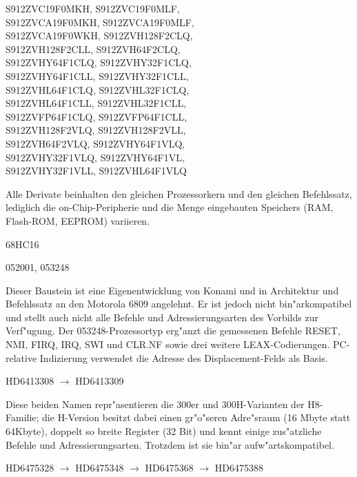 \documentclass[12pt,a4paper,twoside]{report}
\begin{document}
\begin{cpulist}
   S912ZVC19F0MKH, S912ZVC19F0MLF,\\
\> S912ZVCA19F0MKH, S912ZVCA19F0MLF,\\
\> S912ZVCA19F0WKH, S912ZVH128F2CLQ,\\
\> S912ZVH128F2CLL, S912ZVH64F2CLQ,\\
\> S912ZVHY64F1CLQ, S912ZVHY32F1CLQ,\\
\> S912ZVHY64F1CLL, S912ZVHY32F1CLL,\\
\> S912ZVHL64F1CLQ, S912ZVHL32F1CLQ,\\
\> S912ZVHL64F1CLL, S912ZVHL32F1CLL,\\
\> S912ZVFP64F1CLQ, S912ZVFP64F1CLL,\\
\> S912ZVH128F2VLQ, S912ZVH128F2VLL,\\
\> S912ZVH64F2VLQ, S912ZVHY64F1VLQ,\\
\> S912ZVHY32F1VLQ, S912ZVHY64F1VL,\\
\> S912ZVHY32F1VLL, S912ZVHL64F1VLQ
\end{cpulist}
Alle Derivate beinhalten den gleichen Prozessorkern und den
gleichen Befehlssatz, lediglich die on-Chip-Peripherie und
die Menge eingebauten Speichers (RAM, Flash-ROM, EEPROM)
variieren.
\begin{cpulist}
   68HC16
\end{cpulist}
\begin{cpulist}
   052001, 053248
\end{cpulist}
Dieser Baustein ist eine Eigenentwicklung von Konami und in
Architektur und Befehlssatz an den Motorola 6809 angelehnt.
Er ist jedoch nicht bin"arkompatibel und stellt auch nicht
alle Befehle und Adressierungsarten des Vorbilds zur Verf"ugung.
Der 053248-Prozessortyp erg"anzt die gemessenen Befehle RESET, NMI,
FIRQ, IRQ, SWI und CLR.NF sowie drei weitere LEAX-Codierungen.
PC-relative Indizierung verwendet die Adresse des Displacement-Felds
als Basis.
\begin{cpulist}
   HD6413308 $\longrightarrow$ HD6413309
\end{cpulist}
Diese beiden Namen repr"asentieren die 300er und 300H-Varianten der
H8-Familie; die H-Version besitzt dabei einen gr"o"seren Adre"sraum
(16 Mbyte statt 64Kbyte), doppelt so breite Register (32 Bit) und
kennt einige zus"atzliche Befehle und Adressierungsarten.  Trotzdem
ist sie bin"ar aufw"artskompatibel.
\begin{cpulist}
   HD6475328 $\longrightarrow$ HD6475348 $\longrightarrow$
   HD6475368 $\longrightarrow$ HD6475388
\end{cpulist}
\end{document}
